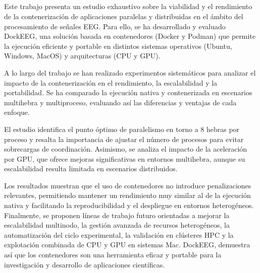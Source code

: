 \chapter*{}


%



\cleardoublepage
\thispagestyle{empty}

\\

\vspace{0.7cm}
\\

Este trabajo presenta un estudio exhaustivo sobre la viabilidad y el rendimiento de la contenerización de aplicaciones paralelas y distribuidas en el ámbito del procesamiento de señales EEG. Para ello, se ha desarrollado y evaluado DockEEG, una solución basada en contenedores (Docker y Podman) que permite la ejecución eficiente y portable en distintos sistemas operativos (Ubuntu, Windows, MacOS) y arquitecturas (CPU y GPU).

A lo largo del trabajo se han realizado experimentos sistemáticos para analizar el impacto de la contenerización en el rendimiento, la escalabilidad y la portabilidad. Se ha comparado la ejecución nativa y contenerizada en escenarios multihebra y multiproceso, evaluando así las diferencias y ventajas de cada enfoque.

El estudio identifica el punto óptimo de paralelismo en torno a 8 hebras por proceso y resalta la importancia de ajustar el número de procesos para evitar sobrecargas de coordinación. Asimismo, se analiza el impacto de la aceleración por GPU, que ofrece mejoras significativas en entornos multihebra, aunque su escalabilidad resulta limitada en escenarios distribuidos.

Los resultados muestran que el uso de contenedores no introduce penalizaciones relevantes, permitiendo mantener un rendimiento muy similar al de la ejecución nativa y facilitando la reproducibilidad y el despliegue en entornos heterogéneos. Finalmente, se proponen líneas de trabajo futuro orientadas a mejorar la escalabilidad multinodo, la gestión avanzada de recursos heterogéneos, la automatización del ciclo experimental, la validación en clústeres HPC y la explotación combinada de CPU y GPU en sistemas Mac. DockEEG, demuestra así que los contenedores son una herramienta eficaz y portable para la investigación y desarrollo de aplicaciones científicas.

